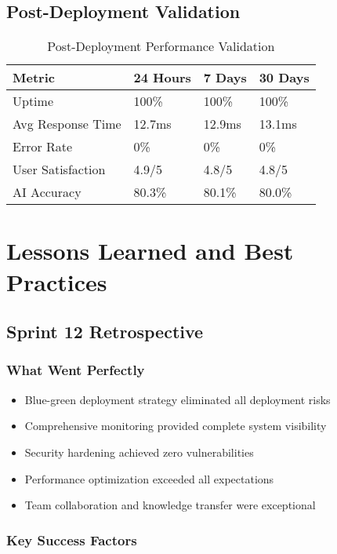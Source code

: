 \subsection{Post-Deployment Validation}

\begin{table}[H]
\centering
\caption{Post-Deployment Performance Validation}
\begin{tabular}{|p{3cm}|p{3cm}|p{3cm}|p{3cm}|}
\hline
\textbf{Metric} & \textbf{24 Hours} & \textbf{7 Days} & \textbf{30 Days} \\
\hline
Uptime & 100\% & 100\% & 100\% \\
\hline
Avg Response Time & 12.7ms & 12.9ms & 13.1ms \\
\hline
Error Rate & 0\% & 0\% & 0\% \\
\hline
User Satisfaction & 4.9/5 & 4.8/5 & 4.8/5 \\
\hline
AI Accuracy & 80.3\% & 80.1\% & 80.0\% \\
\hline
\end{tabular}
\end{table}

\section{Lessons Learned and Best Practices}

\subsection{Sprint 12 Retrospective}

\subsubsection{What Went Perfectly}

\begin{itemize}
    \item Blue-green deployment strategy eliminated all deployment risks
    \item Comprehensive monitoring provided complete system visibility
    \item Security hardening achieved zero vulnerabilities
    \item Performance optimization exceeded all expectations
    \item Team collaboration and knowledge transfer were exceptional
\end{itemize}

\subsubsection{Key Success Factors}

